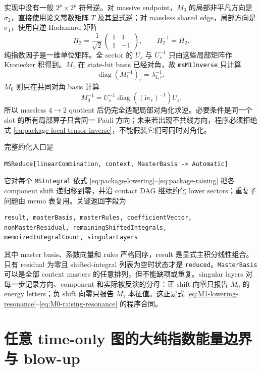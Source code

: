\documentclass[11pt,a4paper]{ctexart}
\newcommand{\ii}{\mathrm i}
\begin{document}
实现中没有一般 $2^p\times2^p$ 符号逆。对 massive endpoint，$M_0$ 的局部非平凡方向是 $\sigma_2$，直接使用论文常数矩阵 $T$ 及其显式逆；对 massless shared edge，局部方向是 $\sigma_1$，使用自逆 Hadamard 矩阵
\begin{equation}
 H_2=\frac1{\sqrt2}
 \begin{pmatrix}1&1\\1&-1\end{pmatrix},
 \qquad H_2^{-1}=H_2.
 \label{eq:package-hadamard-inverse}
\end{equation}
纯指数因子是一维单位矩阵。全 sector 的 $U_s$ 与 $U_s^{-1}$ 只由这些局部矩阵作 Kronecker 积得到。$M_1$ 在 state-bit basis 已经对角，故 \texttt{msM1Inverse} 只计算
\begin{equation}
 \operatorname{diag}(M_1^{-1})_r=\lambda_{1,r}^{-1};
\end{equation}
$M_0$ 则只在共同对角 basis 计算
\begin{equation}
 M_0^{-1}=U_s^{-1}\operatorname{diag}
 \left((\ii\kappa_r)^{-1}\right)U_s.
 \label{eq:package-local-tensor-inverse}
\end{equation}
所以 massless $4\to2$ quotient 后仍完全适配局部对角化求逆。必要条件是同一个 slot 的所有局部算子只含同一 Pauli 方向；未来若出现不共线方向，程序必须拒绝式 \eqref{eq:package-local-tensor-inverse}，不能假装它们可同时对角化。

完整约化入口是
\begin{verbatim}
MSReduce[linearCombination, context, MasterBasis -> Automatic]
\end{verbatim}
它对每个 \texttt{MSIntegral} 依式 \eqref{eq:package-lowering}--\eqref{eq:package-raising} 把各 component shift 递归移到零，并沿 contact DAG 继续约化 lower sectors；重复子问题由 memo 表复用。关键返回字段为
\begin{verbatim}
result, masterBasis, masterRules, coefficientVector,
nonMasterResidual, remainingShiftedIntegrals,
memoizedIntegralCount, singularLayers
\end{verbatim}
其中 master basis、系数向量和 rules 严格同序，result 是显式主积分线性组合。只有 residual 为零且 shifted-integral 列表为空时状态才是 \texttt{reduced}。\texttt{MasterBasis} 可以是全部 context masters 的任意排列，但不能缺项或重复。singular layers 对每一步记录方向、component 和实际被反演的分母：正 shift 向零只报告 $M_0$ 的 energy letters；负 shift 向零只报告 $M_1$ 本征值。这正是式 \eqref{eq:M1-lowering-resonance}--\eqref{eq:M0-raising-resonance} 的程序合同。

\section{任意 time-only 图的大纯指数能量边界与 blow-up}
\label{sec:boundary-blowup}
\end{document}
